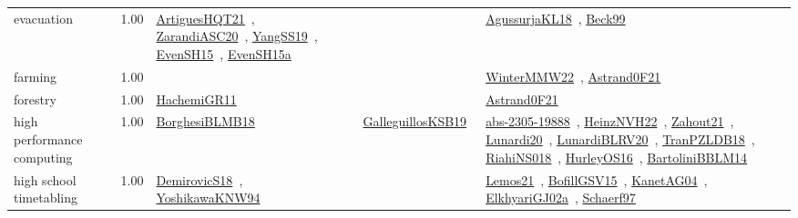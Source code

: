 {\begin{longtable}{p{3cm}r>{\raggedright\arraybackslash}p{6cm}>{\raggedright\arraybackslash}p{6cm}>{\raggedright\arraybackslash}p{8cm}}
\index{evacuation}\index{ApplicationAreas!evacuation}evacuation &  1.00 & \href{../works/ArtiguesHQT21.pdf}{ArtiguesHQT21}~\cite{ArtiguesHQT21}, \href{../works/ZarandiASC20.pdf}{ZarandiASC20}~\cite{ZarandiASC20}, \href{../works/YangSS19.pdf}{YangSS19}~\cite{YangSS19}, \href{../works/EvenSH15.pdf}{EvenSH15}~\cite{EvenSH15}, \href{../works/EvenSH15a.pdf}{EvenSH15a}~\cite{EvenSH15a} &  & \href{../works/AgussurjaKL18.pdf}{AgussurjaKL18}~\cite{AgussurjaKL18}, \href{../works/Beck99.pdf}{Beck99}~\cite{Beck99}\\
\index{farming}\index{ApplicationAreas!farming}farming &  1.00 &  &  & \href{../works/WinterMMW22.pdf}{WinterMMW22}~\cite{WinterMMW22}, \href{../works/Astrand0F21.pdf}{Astrand0F21}~\cite{Astrand0F21}\\
\index{forestry}\index{ApplicationAreas!forestry}forestry &  1.00 & \href{../works/HachemiGR11.pdf}{HachemiGR11}~\cite{HachemiGR11} &  & \href{../works/Astrand0F21.pdf}{Astrand0F21}~\cite{Astrand0F21}\\
\index{high performance computing}\index{ApplicationAreas!high performance computing}high performance computing &  1.00 & \href{../works/BorghesiBLMB18.pdf}{BorghesiBLMB18}~\cite{BorghesiBLMB18} & \href{../works/GalleguillosKSB19.pdf}{GalleguillosKSB19}~\cite{GalleguillosKSB19} & \href{../works/abs-2305-19888.pdf}{abs-2305-19888}~\cite{abs-2305-19888}, \href{../works/HeinzNVH22.pdf}{HeinzNVH22}~\cite{HeinzNVH22}, \href{../works/Zahout21.pdf}{Zahout21}~\cite{Zahout21}, \href{../works/Lunardi20.pdf}{Lunardi20}~\cite{Lunardi20}, \href{../works/LunardiBLRV20.pdf}{LunardiBLRV20}~\cite{LunardiBLRV20}, \href{../works/TranPZLDB18.pdf}{TranPZLDB18}~\cite{TranPZLDB18}, \href{../works/RiahiNS018.pdf}{RiahiNS018}~\cite{RiahiNS018}, \href{../works/HurleyOS16.pdf}{HurleyOS16}~\cite{HurleyOS16}, \href{../works/BartoliniBBLM14.pdf}{BartoliniBBLM14}~\cite{BartoliniBBLM14}\\
\index{high school timetabling}\index{ApplicationAreas!high school timetabling}high school timetabling &  1.00 & \href{../works/DemirovicS18.pdf}{DemirovicS18}~\cite{DemirovicS18}, \href{../works/YoshikawaKNW94.pdf}{YoshikawaKNW94}~\cite{YoshikawaKNW94} &  & \href{../works/Lemos21.pdf}{Lemos21}~\cite{Lemos21}, \href{../works/BofillGSV15.pdf}{BofillGSV15}~\cite{BofillGSV15}, \href{../works/KanetAG04.pdf}{KanetAG04}~\cite{KanetAG04}, \href{../works/ElkhyariGJ02a.pdf}{ElkhyariGJ02a}~\cite{ElkhyariGJ02a}, \href{../works/Schaerf97.pdf}{Schaerf97}~\cite{Schaerf97}\\

\end{longtable}}
